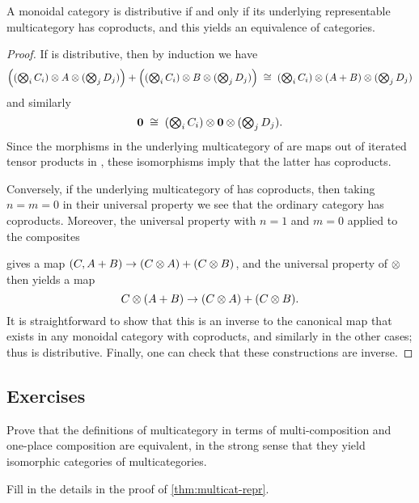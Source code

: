 \begin{thm}\label{thm:multicat-coprod}
  A monoidal category is distributive if and only if its underlying representable multicategory has coproducts, and this yields an equivalence of categories.
\end{thm}
\begin{proof}
  If \cM is distributive, then by induction we have
  \[ \textstyle
  \Big((\bigotimes_i C_i)\otimes A \otimes (\bigotimes_j D_j)\Big) +
  \Big((\bigotimes_i C_i)\otimes B \otimes (\bigotimes_j D_j)\Big)
  \;\cong\;
  (\bigotimes_i C_i)\otimes (A+B) \otimes (\bigotimes_j D_j)
  \]
  and similarly
  \[ \mathbf{0} \;\cong\; \textstyle (\bigotimes_i C_i)\otimes \mathbf{0} \otimes (\bigotimes_j D_j).\]
  Since the morphisms in the underlying multicategory of \cM are maps out of iterated tensor products in \cM, these isomorphisms imply that the latter has coproducts.

  Conversely, if the underlying multicategory of \cM has coproducts, then taking $n=m=0$ in their universal property we see that the ordinary category \cM has coproducts.
  Moreover, the universal property with $n=1$ and $m=0$ applied to the composites
  gives a map $(C,A+B) \to (C\otimes A)+(C\otimes B)$, and the universal property of $\otimes$ then yields a map
  \[C\otimes(A+B) \to (C\otimes A)+(C\otimes B). \]
  It is straightforward to show that this is an inverse to the canonical map that exists in any monoidal category with coproducts, and similarly in the other cases; thus \cM is distributive.
  Finally, one can check that these constructions are inverse.
\end{proof}


\subsection*{Exercises}

\begin{ex}\label{ex:multicat-defns}
  Prove that the definitions of multicategory in terms of multi-composition and one-place composition are equivalent, in the strong sense that they yield isomorphic categories of multicategories.
\end{ex}

\begin{ex}\label{ex:multicat-repr}
  Fill in the details in the proof of \cref{thm:multicat-repr}.
\end{ex}

